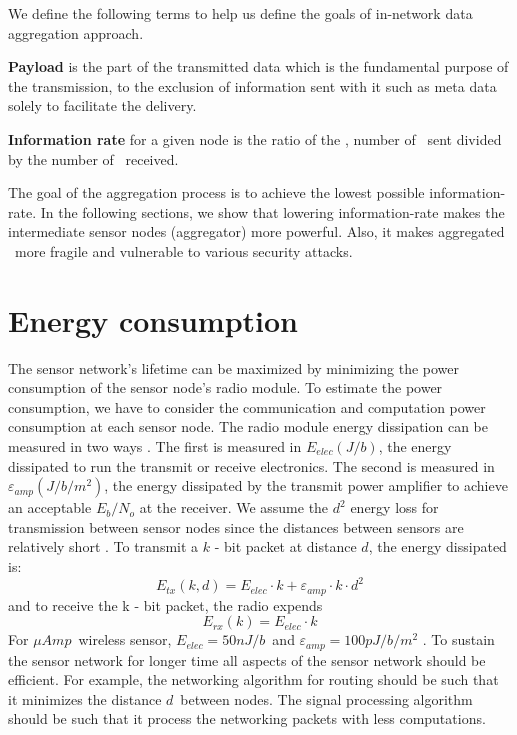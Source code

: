 	We define the following terms to help us define the goals of in-network data aggregation approach.
	\begin{definition}\label{def:payload}\cite{PayloadWiKi}
		\textbf{Payload} is the part of the transmitted data which is the fundamental purpose of the transmission, to the exclusion of information sent with it such as meta data solely to facilitate the delivery.
	\end{definition}
	\begin{definition}\label{def:information-rate}
		\textbf{Information rate} for a given node is the ratio of the \payloads, number of \payloads\ sent divided by the number of \payloads\ received.
	\end{definition}
	The goal of the aggregation process is to achieve the lowest possible information-rate.
	In the following sections, we show that lowering information-rate makes the intermediate sensor nodes (aggregator) more powerful.
	Also, it makes aggregated \payload\ more fragile and vulnerable to various security attacks.

\section{Energy consumption}
	The sensor network's lifetime can be maximized by minimizing the power consumption of the sensor node's radio module.
	To estimate the power consumption, we have to consider the communication and computation power consumption at each sensor node.
	The radio module energy dissipation can be measured in two ways \cite{wang2002energy}.
	The first is measured in $E_{elec} (J/b)$, the energy dissipated to run the transmit or receive electronics.
	The second is measured in $\varepsilon_{amp} (J/b/m^2)$, the energy dissipated by the transmit power amplifier to achieve an acceptable $E_{b} / N_{o} $ at the receiver.
	We assume the $d^2$ energy loss for transmission between sensor nodes since the distances between sensors are relatively short \cite{ettus1998system}. 
	To transmit a $k$ - bit packet at distance $d$, the energy dissipated is:
	\begin{equation}
		E_{tx}(k, d) = E_{elec} \cdot k + \varepsilon_{amp} \cdot k \cdot d^{2}
	\end{equation}
	and to receive the k - bit packet, the radio expends
	\begin{equation}
		E_{rx}(k) = E_{elec} \cdot k
	\end{equation}
	For $\mu Amp$\ wireless sensor, $E_{elec} = 50nJ/b$\ and $\varepsilon_{amp} = 100pJ/b/m^2$ \cite{wang2002energy}.
	To sustain the sensor network for longer time all aspects of the sensor network should be efficient.
	For example, the networking algorithm for routing should be such that it minimizes the distance $d$\ between nodes.
	The signal processing algorithm should be such that it process the networking packets with less computations.

